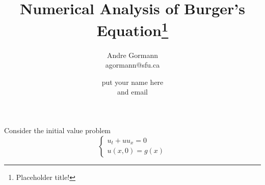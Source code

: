 \documentclass{myproject}
\title{Numerical Analysis of Burger's Equation\footnote{Placeholder title!}}
\date{}
\author{
    Andre Gormann\\
    agormann@sfu.ca
    \and
    put your name here\\
    and email
}
\begin{document}
\maketitle

Consider the initial value problem
\[
    \begin{cases}
        u_t + uu_x = 0 \\
        u(x, 0) = g(x)
    \end{cases}
\]
\end{document}

